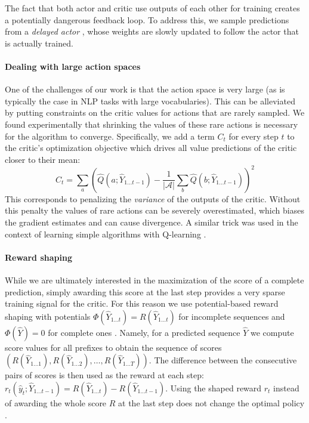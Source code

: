 \documentclass{article} \usepackage{iclr2017_conference,times}
\begin{document}
The fact that both actor and critic use
outputs of each other for training creates a potentially
dangerous feedback loop. To address this, we
sample predictions from a \textit{delayed actor} \citep{lillicrap2015continuous},
whose weights are slowly updated to follow the actor that
is actually trained.

\paragraph{Dealing with large action spaces}

One of the challenges of our work is that the action space is very large (as is typically the case in
NLP tasks with large vocabularies). This can be alleviated by putting constraints on
the critic values for actions that are rarely sampled. We found experimentally
that shrinking the values of these rare actions is
 necessary for the algorithm to converge. Specifically, we add a term $C_t$ for every step $t$ to the
critic's optimization objective which drives all value predictions of the critic
closer to their mean: 
\begin{equation} 
    C_t = \sum_{a}\left( 
        \hat{Q}(a; \hat{Y}_{1\ldots t-1}) 
        - \frac{1}{|\mathcal{A}|}\sum_{b}\hat{Q}(b; \hat{Y}_{1 \ldots t-1}) 
    \right)^2 \label{eq:variance_penalty}
\end{equation} This corresponds to
penalizing the \emph{variance} of the outputs of the critic. 
Without this penalty the values of rare actions can be severely overestimated,
which biases the gradient estimates and can cause divergence. 
A similar trick was used in the context of learning 
simple algorithms with Q-learning \citep{zaremba2015learning}.

\paragraph{Reward shaping}
While we are ultimately interested in the maximization of the score of a complete
prediction, simply awarding this score at the last 
step provides a very sparse training signal for the critic. For this reason we
use potential-based reward shaping with potentials $\Phi(\hat{Y}_{1 \ldots t})
= R(\hat{Y}_{1 \ldots t})$ for incomplete sequences and $\Phi(\hat{Y}) = 0$ for
complete ones \citep{ng1999policy}. Namely, for a predicted sequence $\hat{Y}$
we compute score values for all prefixes to obtain the sequence of scores
$(R(\hat{Y}_{1\ldots 1}),R(\hat{Y}_{1\ldots 2}),\ldots,R(\hat{Y}_{1\ldots
T}))$.  The difference between the consecutive pairs of scores is then used
as the reward at each step: $r_t(\hat{y}_t;\hat{Y}_{1\ldots
t-1})=R(\hat{Y}_{1\ldots t})-R(\hat{Y}_{1\ldots t-1})$. Using the shaped reward $r_t$ 
instead of awarding the whole score $R$ at the last step does not change the 
optimal policy
\citep{ng1999policy}.
\end{document}
